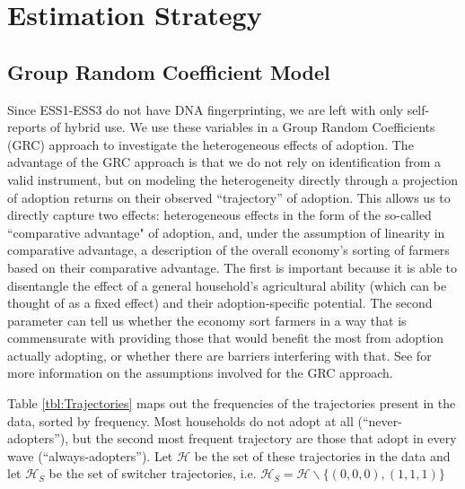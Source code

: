 \documentclass[11pt]{article}
\begin{document}
\section{Estimation Strategy}\label{sec:strategy}

\subsection{Group Random Coefficient Model}

Since ESS1-ESS3 do not have DNA fingerprinting, we are left with only self-reports of hybrid use. We use these variables in a Group Random Coefficients (GRC) approach to investigate the heterogeneous effects of adoption. The advantage of the GRC approach is that we do not rely on identification from a valid instrument, but on modeling the heterogeneity directly through a projection of adoption returns on their observed ``trajectory'' of adoption. This allows us to directly capture two effects: heterogeneous effects in the form of the so-called ``comparative advantage" of adoption, and, under the assumption of linearity in comparative advantage, a description of the overall economy's sorting of farmers based on their comparative advantage. The first is important because it is able to disentangle the effect of a general household's agricultural ability (which can be thought of as a fixed effect) and their adoption-specific potential. The second parameter can tell us whether the economy sort farmers in a way that is commensurate with providing those that would benefit the most from adoption actually adopting, or whether there are barriers interfering with that. See \cite{Tjernstrom_Emilia_Dalia_Ghanem_Oscar_Barriga_Cabanillas_Travis_J_Lybbert_Jeffrey_D_Michler_and_Aleksandr_Michuda2020-bc} for more information on the assumptions involved for the GRC approach. 




Table \ref{tbl:Trajectories} maps out the frequencies of the trajectories present in the data, sorted by frequency. Most households do not adopt at all (``never-adopters''), but the second most frequent trajectory are those that adopt in every wave (``always-adopters''). Let $\mathcal{H}$ be the set of these trajectories in the data and let $\mathcal{H}_S$ be the set of switcher trajectories, i.e. $\mathcal{H}_S = \mathcal{H}\backslash\{(0,0,0), (1,1,1)\}$
\end{document}
